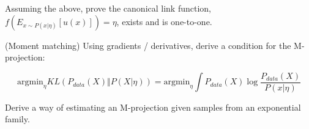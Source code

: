 \documentclass[a4paper]{article}
\begin{document}
Assuming the above, prove the canonical link function, $f( E_{ x \sim P( x \vert \eta) } [ u(x) ] ) = \eta $, exists and is one-to-one.

(Moment matching) Using gradients / derivatives, derive a condition for the M-projection:

\begin{equation}
  \text{argmin}_\eta KL \left( P_{data}(X) \Vert P( X \vert \eta) \right) = \text{argmin}_\eta \int P_{data}(X) \log \frac{ P_{data}(X) }{ P( x \vert \eta) }
  \label{}
\end{equation}

Derive a way of estimating an M-projection given samples from an exponential family.
\end{document}
